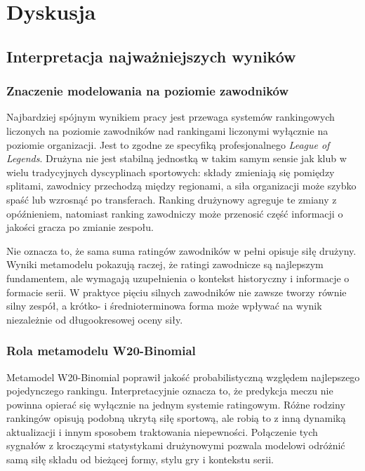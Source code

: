 \chapter{Dyskusja}

\section{Interpretacja najważniejszych wyników}

\subsection{Znaczenie modelowania na poziomie zawodników}

Najbardziej spójnym wynikiem pracy jest przewaga systemów rankingowych liczonych na poziomie
zawodników nad rankingami liczonymi wyłącznie na poziomie organizacji. Jest to zgodne ze specyfiką
profesjonalnego \textit{League of Legends}. Drużyna nie jest stabilną jednostką w takim samym sensie
jak klub w wielu tradycyjnych dyscyplinach sportowych: składy zmieniają się pomiędzy splitami,
zawodnicy przechodzą między regionami, a siła organizacji może szybko spaść lub wzrosnąć po
transferach. Ranking drużynowy agreguje te zmiany z opóźnieniem, natomiast ranking zawodniczy może
przenosić część informacji o jakości gracza po zmianie zespołu.

Nie oznacza to, że sama suma ratingów zawodników w pełni opisuje siłę drużyny. Wyniki metamodelu
pokazują raczej, że ratingi zawodnicze są najlepszym fundamentem, ale wymagają uzupełnienia o
kontekst historyczny i informacje o formacie serii. W praktyce pięciu silnych zawodników nie zawsze
tworzy równie silny zespół, a krótko- i średnioterminowa forma może wpływać na wynik niezależnie od
długookresowej oceny siły.

\subsection{Rola metamodelu W20-Binomial}

Metamodel W20-Binomial poprawił jakość probabilistyczną względem najlepszego pojedynczego rankingu.
Interpretacyjnie oznacza to, że predykcja meczu nie powinna opierać się wyłącznie na jednym systemie
ratingowym. Różne rodziny rankingów opisują podobną ukrytą siłę sportową, ale robią to z inną
dynamiką aktualizacji i innym sposobem traktowania niepewności. Połączenie tych sygnałów z
kroczącymi statystykami drużynowymi pozwala modelowi odróżnić samą siłę składu od bieżącej formy,
stylu gry i kontekstu serii.

